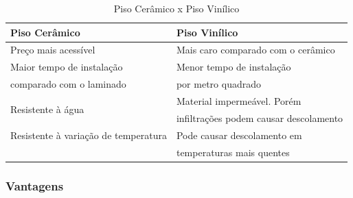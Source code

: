 \begin{table}[H]
\centering
\begin{tabular}{|l|l|}
\hline 
\textbf{Piso Cerâmico} & \textbf{Piso Vinílico}\tabularnewline
\hline 
\hline 
Preço mais acessível & Mais caro comparado com o cerâmico\tabularnewline
\hline 
Maior tempo de instalação  & Menor tempo de instalação \tabularnewline
comparado com o laminado & por metro quadrado\tabularnewline
\hline 
\multirow{2}{*}{Resistente à água} & Material impermeável. Porém \tabularnewline
 & infiltrações podem causar descolamento\tabularnewline
\hline 
Resistente à variação de temperatura & Pode causar descolamento em \tabularnewline
 & temperaturas mais quentes\tabularnewline
\hline 
\end{tabular}
\caption{Piso Cerâmico x Piso Vinílico}
\end{table}

\subsubsection*{\textbf{Vantagens}}

